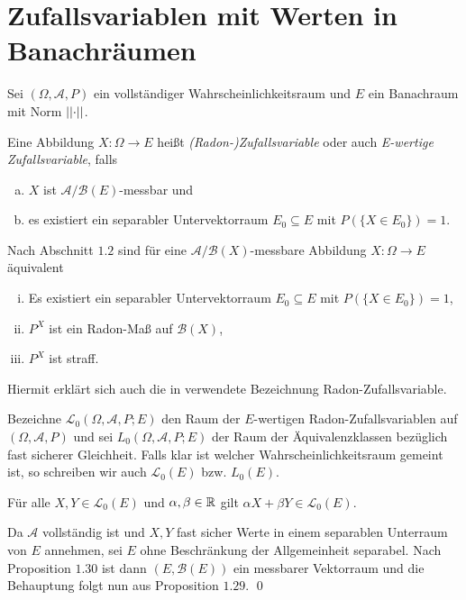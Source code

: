 \section{Zufallsvariablen mit Werten in Banachräumen}
Sei $(\Omega, \mathcal{A}, P)$ ein vollständiger Wahrscheinlichkeitsraum und $E$ ein Banachraum mit Norm $\lvert\lvert \cdot \rvert\rvert$. 
\begin{mydef}
    Eine Abbildung $X: \Omega \to E$ heißt \textit{(Radon-)Zufallsvariable} oder auch \textit{E-wertige Zufallsvariable}, falls 
    \begin{enumerate}[(a)]
        \item $X$ ist $\mathcal{A}/\mathcal{B}(E)$-messbar und
        \item es existiert ein separabler Untervektorraum $E_0 \subseteq E$ mit $P(\{X \in E_0\}) = 1$. 
    \end{enumerate}
\end{mydef}

\begin{remark}
    Nach Abschnitt $1.2$ sind für eine $\mathcal{A}/\mathcal{B}(X)$-messbare Abbildung $X: \Omega \to E$ äquivalent
    \begin{enumerate}[(i)]
        \item Es existiert ein separabler Untervektorraum $E_0 \subseteq E$ mit $P(\{X \in E_0\}) = 1$,
        \item $P^X$ ist ein Radon-Maß auf $\mathcal{B}(X)$, 
        \item $P^X$ ist straff. 
    \end{enumerate}
    Hiermit erklärt sich auch die in \cite{ledoux-talagrand} verwendete Bezeichnung Radon-Zufallsvariable. 
\end{remark}

Bezeichne $\mathcal{L}_0(\Omega, \mathcal{A}, P; E)$ den Raum der $E$-wertigen Radon-Zufallsvariablen auf $(\Omega,\mathcal{A},P)$ und sei $L_0(\Omega, \mathcal{A}, P;E)$ der Raum der Äquivalenzklassen bezüglich fast sicherer Gleichheit. 
Falls klar ist welcher Wahrscheinlichkeitsraum gemeint ist, so schreiben wir auch $\mathcal{L}_0(E)$ bzw. $L_0(E)$. 

\begin{proposition}
   Für alle $X,Y \in \mathcal{L}_0(E)$ und $\alpha, \beta \in \mathbb{R}$ gilt $\alpha X + \beta Y \in \mathcal{L}_0(E)$.
\end{proposition}

\begin{proof*}
    Da $\mathcal{A}$ vollständig ist und $X,Y$ fast sicher Werte in einem separablen Unterraum von $E$ annehmen, sei $E$ ohne Beschränkung der Allgemeinheit separabel. 
    Nach Proposition $1.30$ ist dann $(E, \mathcal{B}(E))$ ein messbarer Vektorraum und die Behauptung folgt nun aus Proposition $1.29$. \qed 
\end{proof*}

